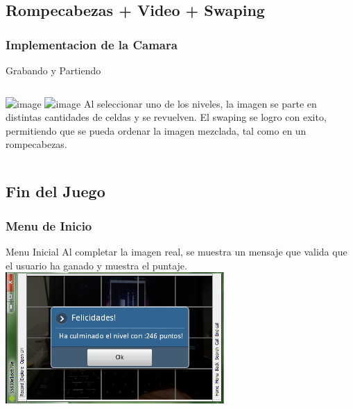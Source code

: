 \documentclass[serif,11pt]{beamer}
\begin{document}
		\subsection{Rompecabezas + Video + Swaping}

		\begin{frame}
			\frametitle{Implementacion de la Camara}
				\begin{block}{Grabando y Partiendo}
					\begin{columns}
						 \hspace{0.1cm}
						\includegraphics<1>[width=\textwidth]{inter} 
						\includegraphics<2>[width=\textwidth]{completando} 
						Al seleccionar uno de los niveles, la imagen se parte en distintas cantidades de celdas y se revuelven.  El swaping se logro con exito, permitiendo que 
						se pueda ordenar la imagen mezclada, tal como en un rompecabezas.
											
					\end{columns}
				\end{block}
		\end{frame}


	\subsection{Fin del Juego}
		\begin{frame}
			\frametitle{Menu de Inicio}
				\begin{block}{Menu Inicial}
				Al completar la imagen real, se muestra un mensaje que valida que el usuario ha ganado y muestra el puntaje.
				\includegraphics[height=5cm]{gano} 
				
				\end{block}
		\end{frame}

	
\end{document}
